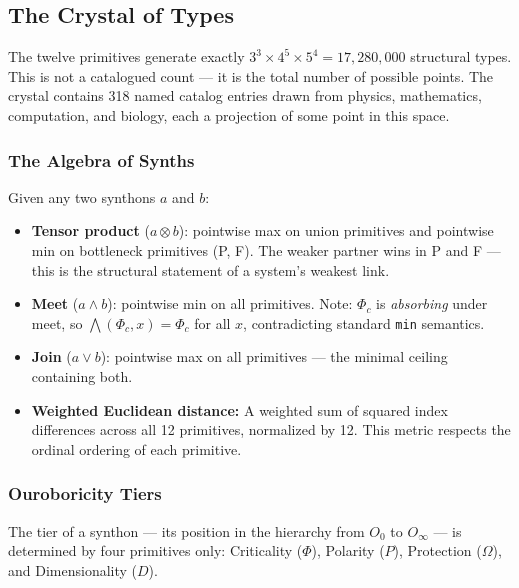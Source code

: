 \documentclass[12pt,a4paper]{article}
\begin{document}
\subsection{The Crystal of Types}

The twelve primitives generate exactly $3^3 \times 4^5 \times 5^4 = 17{,}280{,}000$ structural types. This is not a catalogued count --- it is the total number of possible points. The crystal contains 318 named catalog entries drawn from physics, mathematics, computation, and biology, each a projection of some point in this space.

\subsubsection{The Algebra of Synths}

Given any two synthons $a$ and $b$:

\begin{itemize}
    \item \textbf{Tensor product} ($a \otimes b$): pointwise max on union primitives and pointwise min on bottleneck primitives (P, F). The weaker partner wins in P and F --- this is the structural statement of a system's weakest link.
    \item \textbf{Meet} ($a \wedge b$): pointwise min on all primitives. Note: $\Phi_c$ is \emph{absorbing} under meet, so $\bigwedge(\Phi_c, x) = \Phi_c$ for all $x$, contradicting standard \texttt{min} semantics.
    \item \textbf{Join} ($a \vee b$): pointwise max on all primitives --- the minimal ceiling containing both.
    \item \textbf{Weighted Euclidean distance:} A weighted sum of squared index differences across all 12 primitives, normalized by 12. This metric respects the ordinal ordering of each primitive.
\end{itemize}

\subsubsection{Ouroboricity Tiers}

The tier of a synthon --- its position in the hierarchy from $O_0$ to $O_{\infty}$ --- is determined by four primitives only: Criticality ($\Phi$), Polarity ($P$), Protection ($\Omega$), and Dimensionality ($D$).
\end{document}

